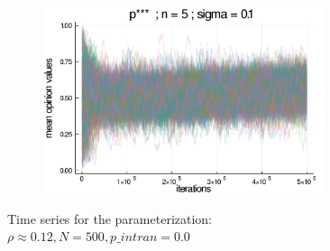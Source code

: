 \documentclass{article}
\begin{document}
\begin{figure}[H]
      \begin{subfigure}[b]{0.48\textwidth}
      \includegraphics[width=0.9\textwidth]{img/series/tseries3/Poodlcalculatep***n5-rho01118033988749895-sigma01-00intransrandom.png}
    \end{subfigure}
    
      \caption{Time series for the parameterization: \(\rho \approx 0.12, N =
        500, p\_intran = 0.0 \)}
      \label{fig:tseries3}
    \end{figure}
\end{document}
